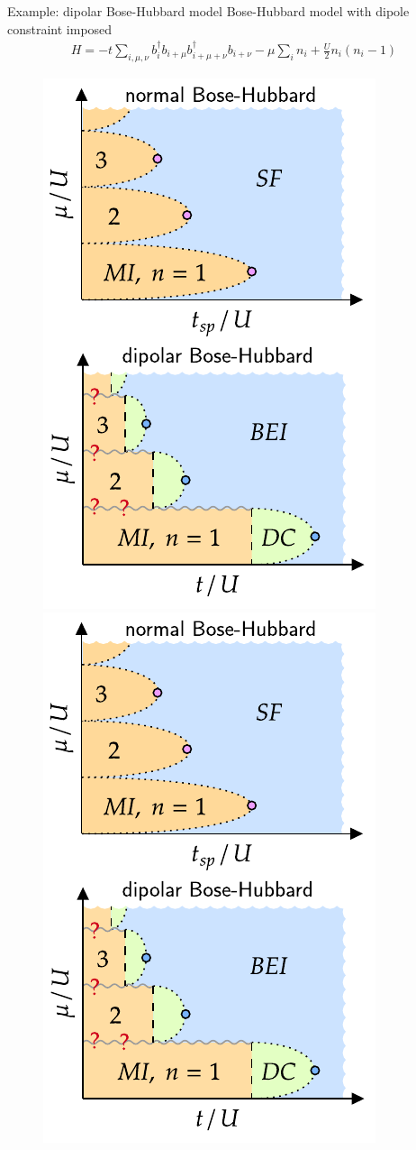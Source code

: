 \documentclass{beamer}
\begin{document}
\begin{frame}{Example: dipolar Bose-Hubbard model}
Bose-Hubbard model with dipole constraint imposed
\begin{align*}
H = -t \sum_{i,\mu,\nu} b^\dagger_i b_{i+\mu} b^\dagger_{i+\mu+\nu} b_{i+\nu} -\mu \sum_i n_i + \frac{U}{2} n_i(n_i-1)
\end{align*}
\begin{figure}
	\centering
	\includegraphics[scale=.8]{bhm}
	\includegraphics[scale=.8]{dbhm}

\end{figure}
\end{frame}
\end{document}
